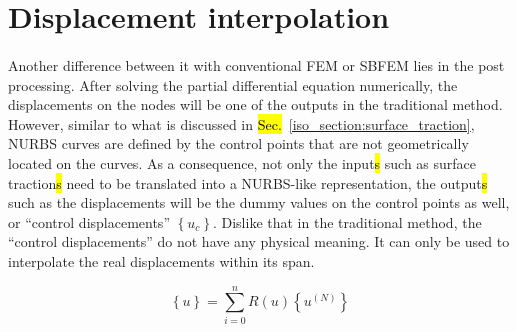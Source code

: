 \section{Displacement interpolation}
\label{iso_section:interpolation}
\paragraph{}
Another difference between it with conventional FEM or SBFEM lies in the post processing.
After solving the partial differential equation numerically, the displacements on the nodes will be one of the outputs in the traditional method.
However, similar to what is discussed in \hl{Sec.}~\ref{iso_section:surface_traction}, NURBS curves are defined by the control points
    that are not geometrically located on the curves.
As a consequence, not only the input\hl{s} such as surface traction\hl{s} need to be translated into a NURBS-like representation, the output\hl{s} such as the displacements will be the dummy values on the control points as well, or ``control displacements''
    $\left\{ u_c \right\}$.
Dislike that in the traditional method, the ``control displacements'' do not have any physical meaning. It can only be used
    to interpolate the real displacements within its span.

\begin{equation}
    \left\{ u \right\}=
    \sum_{i=0}^n
    R(u) \left\{u^{(N)}\right\}
\label{iso_eq:displacement_interpolation}
\end{equation}
